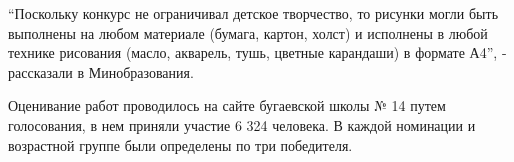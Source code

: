 
\enquote{Поскольку конкурс не ограничивал детское творчество, то рисунки могли быть
выполнены на любом материале (бумага, картон, холст) и исполнены в любой
технике рисования (масло, акварель, тушь, цветные карандаши) в формате А4}, -
рассказали в Минобразования.


Оценивание работ проводилось на сайте бугаевской школы № 14 путем голосования,
в нем приняли участие 6 324 человека. В каждой номинации и возрастной группе
были определены по три победителя.

